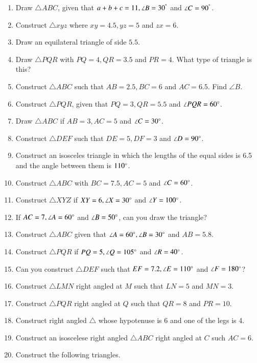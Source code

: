 \documentclass[journal,12pt,twocolumn]{IEEEtran}
\renewcommand\thesection{\arabic{section}}
\begin{document}
\begin{enumerate}[label=\thesection.\arabic*
,ref=\thesection.\theenumi]
Solving the equivalent matrix equation gives the desired answer.
\item Draw $\triangle ABC$,  given that $a+b+c = 11, \angle B = 30^{\degree}$ and $\angle C = 90^{\degree}$.
\item Construct $\triangle xyz$ where $xy = 4.5, yz = 5$ and $zx = 6$.
\item Draw an equilateral triangle of side $5.5$.
\item Draw $\triangle PQR$ with $PQ = 4, QR = 3.5$ and $PR = 4$.  What type of triangle is this?
\item Construct $\triangle ABC$ such that $AB = 2.5, BC = 6$ and $AC = 6.5$.  Find $\angle B$.
\item Construct $\triangle PQR$, given that $PQ = 3, QR = 5.5$ and $\angle PQR = 60 \degree$.
\item Draw $\triangle ABC$ if $AB = 3, AC = 5$ and $\angle C = 30 \degree$.
\item Construct $\triangle DEF$ such that $DE = 5, DF = 3$ and $\angle D = 90\degree$.
\item Construct an isosceles triangle in which the lengths of the equal sides is 6.5 and the angle between them is $110\degree$.
\item Construct $\triangle ABC$  with $BC = 7.5, AC = 5$ and $\angle C = 60\degree$.
\item Construct $\triangle XYZ$ if $XY = 6, \angle X = 30\degree$ and $\angle Y = 100 \degree$.
\item If $AC = 7, \angle A = 60\degree$ and $\angle B = 50 \degree$, can you draw the triangle?
\item Construct $\triangle ABC$ given that $\angle A = 60\degree, \angle B = 30\degree$ and $AB = 5.8$.
\item Construct $\triangle PQR$ if $PQ = 5, \angle Q = 105 \degree$ and $\angle R = 40 \degree$.
\item Can you construct $\triangle DEF$ such that $EF = 7.2, \angle E = 110\degree$ and $\angle F = 180\degree$?
\item Construct  $\triangle LMN$ right angled at $M$ such that $LN = 5$ and $MN = 3$.
\item Construct  $\triangle PQR$ right angled at $Q$ such that $QR = 8$ and $PR = 10$.
\item Construct  right angled $\triangle $ whose hypotenuse  is 6 and one of the legs is 4.
\item Construct  an isoscelese right angled $\triangle ABC$ right angled at $C$ such $AC = 6$.
\item Construct the following triangles.
\end{enumerate}
\end{document}
